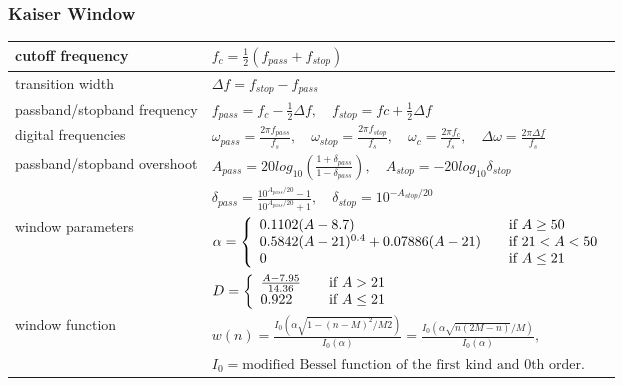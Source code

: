 \subsubsection{Kaiser Window}
\begin{tabular}{|l|l|}
	\hline
	cutoff frequency & $f_c=\frac{1}{2}(f_{pass}+f_{stop})$ \\ \hline
	transition width & $\Delta f = f_{stop}-f_{pass}$\\ \hline
	passband/stopband frequency & $f_{pass} = f_c - \frac{1}{2}\Delta f,\quad f_{stop}= fc+\frac{1}{2}\Delta f$\\ \hline
	digital frequencies & $\omega_{pass}=\frac{2\pi f_{pass}}{f_s},\quad \omega_{stop}=\frac{2\pi f_{stop}}{f_s},\quad
						  \omega_{c}=\frac{2\pi f_c}{f_s},\quad \Delta\omega=\frac{2\pi \Delta f}{f_s}$\\ \hline
	passband/stopband overshoot & $A_{pass}=20log_{10}\left(\frac{1+\delta_{pass}}{1-\delta_{pass}}\right),\quad A_{stop}=-20log_{10}\delta_{stop}$\\
								& $\delta_{pass}=\frac{10^{A_{pass}/20}-1}{10^{A_{pass}/20}+1},\quad \delta_{stop} = 10^{-A_{stop}/20}$ \\ \hline
	window parameters &
		$\alpha = \left\{
					\begin{array}{l l}
						0.1102(A-8.7)& \quad \text{if } A \geq 50\\
						0.5842(A-21)^{0.4}+0.07886(A-21) & \quad \text{if }21 < A < 50\\
						0 & \quad \text{if } A \leq 21
					\end{array} \right. $\\
	&	$D = \left\{
					\begin{array}{l l}
						\frac{A-7.95}{14.36}& \quad \text{if } A>21\\
						0.922 & \quad \text{if } A \leq 21
					\end{array} \right. $\\ \hline
	window function & $w(n)=\frac{I_0(\alpha\sqrt{1-(n-M)^2/M2})}{I_0(\alpha)}=\frac{I_0(\alpha\sqrt{n(2M-n)}/M)}{I_0(\alpha)},$ \\
	& $I_0=\text{modified Bessel function of the first kind and 0th order.}$\\
	\hline						  
\end{tabular}

